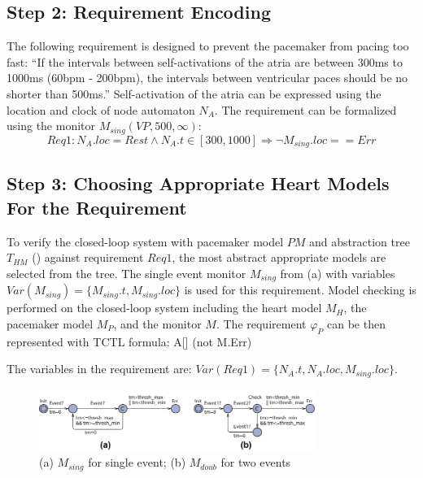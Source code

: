 \subsection*{Step 2: Requirement Encoding}
The following requirement is designed to prevent the pacemaker from pacing too fast: 
``If the intervals between self-activations of the atria are between 300ms to 1000ms (60bpm - 200bpm), the intervals between ventricular paces should be no shorter than 500ms.''
Self-activation of the atria can be expressed using the location and clock of node automaton $N_A$.
The requirement can be formalized using the monitor  $M_{sing}(VP,500,\infty)$:
\[Req1: N_A.loc=Rest \land N_A.t\in [300,1000] \Rightarrow \neg M_{sing}.loc==Err\]
%
 \subsection*{Step 3: Choosing Appropriate Heart Models For the Requirement}
To verify the closed-loop system with pacemaker model $PM$ and abstraction tree $T_{HM}$ () against requirement $Req1$, the most abstract appropriate models are selected from the tree. 
The single event monitor $M_{sing}$ from (a) with variables $Var(M_{sing})=\{M_{sing}.t,M_{sing}.loc\}$ is used for this requirement. Model checking is performed on the closed-loop system including the heart model $M_H$, the pacemaker model $M_P$, and the monitor $M$. The requirement $\varphi_P$ can be then represented with TCTL formula:
 \textsf{A[] (not M.Err)}

The variables in the requirement are:
$Var(Req1)=\{N_A.t,N_A.loc,M_{sing}.loc\}$.
\begin{figure}[b]
		\centering
		\includegraphics[width=0.8\textwidth]{figs/monitor.pdf}
		\caption{\small (a) $M_{sing}$ for single event; (b) $M_{doub}$ for two events}
		  \vspace{-10pt}
		\label{fig:monitor}
\end{figure}

